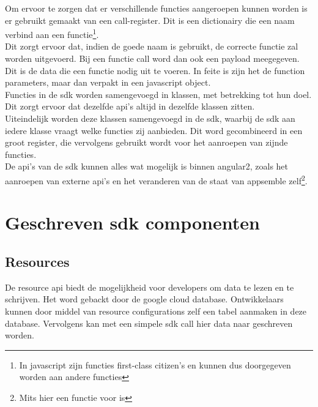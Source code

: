 Om ervoor te zorgen dat er verschillende functies aangeroepen kunnen worden is er gebruikt gemaakt van een call-register. Dit is een dictionairy die een naam verbind aan een functie\footnote{In javascript zijn functies first-class citizen's en kunnen dus doorgegeven worden aan andere functies}. \\

Dit zorgt ervoor dat, indien de goede naam is gebruikt, de correcte functie zal worden uitgevoerd. Bij een functie call word dan ook een payload meegegeven. Dit is de data die een functie nodig uit te voeren. In feite is zijn het de function parameters, maar dan verpakt in een javascript object. \\

Functies in de sdk worden samengevoegd in klassen, met betrekking tot hun doel. Dit zorgt ervoor dat dezelfde api's altijd in dezelfde klassen zitten. \\

Uiteindelijk worden deze klassen samengevoegd in de sdk, waarbij de sdk aan iedere klasse vraagt welke functies zij aanbieden. Dit word gecombineerd in een groot register, die vervolgens gebruikt wordt voor het aanroepen van zijnde functies. \\

De api's van de sdk kunnen alles wat mogelijk is binnen angular2, zoals het aanroepen van externe api's en het veranderen van de staat van appsemble zelf\footnote{Mits hier een functie voor is}.

\section{Geschreven sdk componenten}

\subsection{Resources}

De resource api biedt de mogelijkheid voor developers om data te lezen en te schrijven. Het word gebackt door de google cloud database. Ontwikkelaars kunnen door middel van resource configurations zelf een tabel aanmaken in deze database. Vervolgens kan met een simpele sdk call hier data naar geschreven worden.
